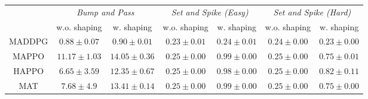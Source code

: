 \begin{tabular}{ccccccc}
\toprule
 & \multicolumn{2}{c}{\textit{Bump and Pass}} & \multicolumn{2}{c}{\textit{Set and Spike (Easy)}} & \multicolumn{2}{c}{\textit{Set and Spike (Hard)}} \\
       & w.o. shaping & w. shaping & w.o. shaping & w. shaping & w.o. shaping & w. shaping \\
\midrule
MADDPG & $0.88 \pm 0.07$ & $0.90 \pm 0.01$ & $0.23 \pm 0.01$ & $0.24 \pm 0.01$  & $0.24 \pm 0.00$ & $0.23 \pm 0.00$ \\
MAPPO  & $\bm{11.17 \pm 1.03}$ & $\bm{14.05 \pm 0.36}$ & $\bm{0.25 \pm 0.00}$ & $\bm{0.99 \pm 0.00}$ & $\bm{0.25 \pm 0.00}$ & $0.75 \pm 0.01$ \\
HAPPO  & $6.65 \pm 3.59$ & $12.35 \pm 0.67$ & $\bm{0.25 \pm 0.00}$ & $0.98 \pm 0.00$ & $\bm{0.25 \pm 0.00}$ & $\bm{0.82 \pm 0.11}$ \\
MAT    & $7.68 \pm 4.9$ & $13.41 \pm 0.14$ & $\bm{0.25 \pm 0.00}$ & $\bm{0.99 \pm 0.00}$ & $\bm{0.25 \pm 0.00}$ & $0.75 \pm 0.00$ \\
\bottomrule 
\end{tabular}



